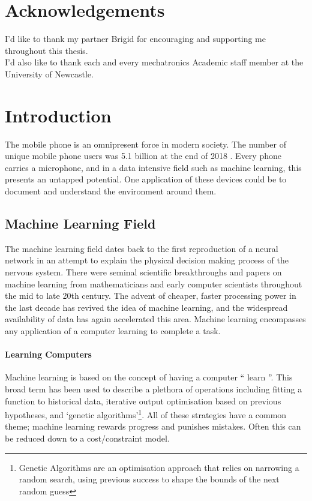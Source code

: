 \documentclass{UoNMCHA}
\newcommand{\inlineQuote}[1]{`` #1 ''}
\numberwithin{equation}{section}
\begin{document}
\section*{Acknowledgements}
\vspace{-3mm}
I'd like to thank my partner Brigid for encouraging and supporting me throughout this thesis. \\

I'd also like to thank each and every mechatronics Academic staff member at the University of Newcastle.%

\newpage
\tableofcontents
\newpage
\clearpage \section{Introduction}
 
The mobile phone is an omnipresent force in modern society. The number of unique mobile phone users was 5.1 billion at the end of 2018 \cite{GSMA}. Every phone carries a microphone, and in a data intensive field such as machine learning, this presents an untapped potential. One application of these devices could be to document and understand the environment around them.

\subsection{Machine Learning Field}
The machine learning field dates back to the first reproduction of a neural network \cite{mcculloch1943logical} in an attempt to explain the physical decision making process of the nervous system. There were seminal scientific breakthroughs and papers on machine learning from mathematicians and early computer scientists throughout the mid to late 20th century. The advent of cheaper, faster processing power in the last decade has revived the idea of machine learning, and the widespread availability of data has again accelerated this area. Machine learning encompasses any application of a computer learning to complete a task.

\paragraph{Learning Computers}
Machine learning is based on the concept of having a computer \inlineQuote{learn}. This broad term has been used to describe a plethora of operations including fitting a function to historical data, iterative output optimisation based on previous hypotheses, and `genetic algorithms'\footnote{Genetic Algorithms are an optimisation approach that relies on narrowing a random search, using previous success to shape the bounds of the next random guess}. All of these strategies have a common theme; machine learning rewards progress and punishes mistakes. Often this can be reduced down to a cost/constraint model.
\end{document}
